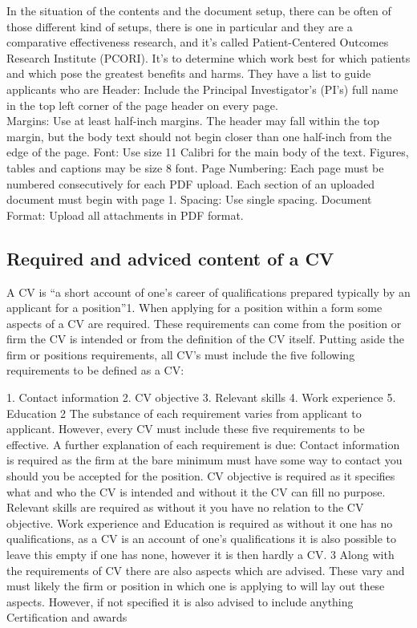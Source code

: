 In the situation of the contents and the document setup, there can be often of those different kind of setups,
there is one in particular and they are a comparative effectiveness research, and it's called
Patient-Centered Outcomes Research Institute (PCORI).
It's to determine which work best for which patients and which pose the greatest benefits and harms. %
They have a list to guide applicants who are
Header: Include the Principal Investigator’s (PI’s) full name in the top left corner of the page header on every page. \\
Margins: Use at least half-inch margins. The header may fall within the top margin, but the body text should not begin closer than one half-inch from the edge of the page.
Font: Use size 11 Calibri for the main body of the text. Figures, tables and captions may be size 8 font.
Page Numbering: Each page must be numbered consecutively for each PDF upload. Each section of an uploaded document must begin with page 1.
Spacing: Use single spacing.
Document Format: Upload all attachments in PDF format.

\subsection{Required and adviced content of a CV}
A CV  is “a short account of one’s career of qualifications prepared typically by an applicant for a position”1. When applying for a position within a form some aspects of a CV are required. These requirements can come from the position or firm the CV is intended or from the definition of the CV itself.
Putting aside the firm or positions requirements, all CV’s must include the five following requirements to be defined as a CV:

1. Contact information
2. CV objective
3. Relevant skills
4. Work experience
5. Education
2
The substance of each requirement varies from applicant to applicant. However, every CV must include these five requirements to be effective. A further explanation of each requirement is due:
Contact information is required as the firm at the bare minimum must have some way to contact you should you be accepted for the position. CV objective is required as it specifies what and who the CV is intended and without it the CV can fill no purpose. Relevant skills are required as without it you have no relation to the CV objective. Work experience and Education is required as without it one has no qualifications, as a CV is an account of one’s qualifications it is also possible to leave this empty if one has none, however it is then hardly a CV.  3
Along with the requirements of CV there are also aspects which are advised. These vary and must likely the firm or position in which one is applying to will lay out these aspects. However, if not specified it is also advised to include anything Certification and awards
